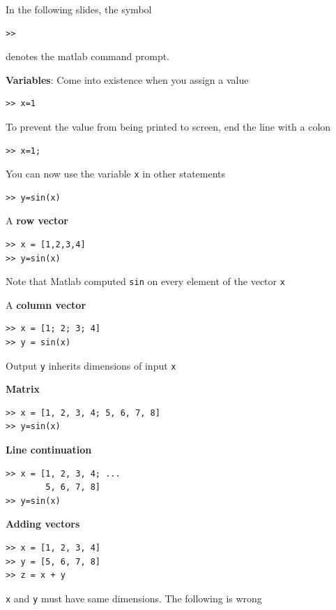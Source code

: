 \documentclass[11pt,xcolor=svgnames,onlymath]{beamer}
\begin{document}
\begin{frame}
In the following slides, the symbol
\begin{lstlisting}
>>
\end{lstlisting}
denotes the matlab command prompt.

\vspace{2mm}

{\bf Variables}: Come into existence when you assign a value
\begin{lstlisting}
>> x=1
\end{lstlisting}
To prevent the value from being printed to screen, end the line with a colon
\begin{lstlisting}
>> x=1;
\end{lstlisting}
You can now use the variable {\tt x} in other statements
\begin{lstlisting}
>> y=sin(x)
\end{lstlisting}

\vspace{2mm}

A {\bf row vector}
\begin{lstlisting}
>> x = [1,2,3,4]
>> y=sin(x)
\end{lstlisting}
Note that Matlab computed {\tt sin} on every element of the vector {\tt x}

\pagebreak

A {\bf column vector}
\begin{lstlisting}
>> x = [1; 2; 3; 4]
>> y = sin(x)
\end{lstlisting}
Output {\tt y} inherits dimensions of input {\tt x}

\vspace{2mm}

{\bf Matrix}
\begin{lstlisting}
>> x = [1, 2, 3, 4; 5, 6, 7, 8]
>> y=sin(x)
\end{lstlisting}

\vspace{2mm}

{\bf Line continuation}
\begin{lstlisting}
>> x = [1, 2, 3, 4; ...
        5, 6, 7, 8]
>> y=sin(x)
\end{lstlisting}

\vspace{2mm}

{\bf Adding vectors}
\begin{lstlisting}
>> x = [1, 2, 3, 4]
>> y = [5, 6, 7, 8]
>> z = x + y
\end{lstlisting}
{\tt x} and {\tt y} must have same dimensions. The following is wrong


\end{frame}
\end{document}
